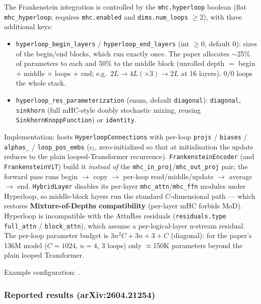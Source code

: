The Frankenstein integration is controlled by the \texttt{mhc.hyperloop}
boolean (flat \texttt{mhc\_hyperloop}; requires \texttt{mhc.enabled} and
\texttt{dims.num\_loops} $\ge 2$), with three additional keys:
\begin{itemize}[leftmargin=*]
    \item \texttt{hyperloop\_begin\_layers} / \texttt{hyperloop\_end\_layers}
        (int $\ge 0$, default $0$): sizes of the begin/end blocks, which run
        exactly once. The paper allocates $\sim$25\% of parameters to each and
        50\% to the middle block (unrolled depth $=$ begin $+$ middle
        $\times$ loops $+$ end; e.g.\ $2L \to 4L(\times3) \to 2L$ at 16
        layers). $0/0$ loops the whole stack.
    \item \texttt{hyperloop\_res\_parameterization} (enum, default
        \texttt{diagonal}): \texttt{diagonal}, \texttt{sinkhorn} (full mHC-style
        doubly stochastic mixing, reusing
        \texttt{Sinkhorn\-Knopp\-Function}) or \texttt{identity}.
\end{itemize}

Implementation:  hosts
\texttt{HyperloopConnections} with per-loop \texttt{projs} / \texttt{biases} /
\texttt{alphas\_\*} / \texttt{loop\_pos\_embs} ($e_l$, zero-initialized so
that at initialisation the update reduces to the plain looped-Transformer
recurrence). \texttt{FrankensteinEncoder} (and \texttt{FrankensteinViT}) build
it \emph{instead of} the \texttt{mhc\_in\_proj}/\texttt{mhc\_out\_proj}
pair; the forward pass runs begin $\to$ copy $\to$ per-loop read/middle/update
$\to$ average $\to$ end. \texttt{HybridLayer} disables its per-layer
\texttt{mhc\_attn}/\texttt{mhc\_ffn} modules under Hyperloop, so middle-block
layers run the standard $C$-dimensional path --- which restores \textbf{Mixture-of-Depths
compatibility} (per-layer mHC forbids MoD). Hyperloop is incompatible with
the AttnRes residuals (\texttt{residuals.type} \texttt{full\_attn} /
\texttt{block\_attn}), which assume a per-logical-layer n-stream residual.
The per-loop parameter budget is $3n^2C + 3n + 3 + C$ (diagonal): for the
paper's 136M model ($C = 1024$, $n = 4$, 3 loops) only $\approx$150K
parameters beyond the plain looped Transformer.

Example configuration: .

\subsubsection*{Reported results (arXiv:2604.21254)}

